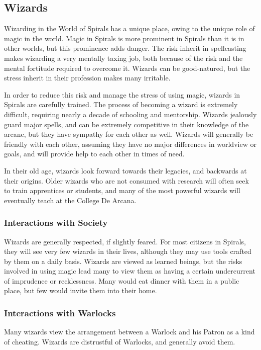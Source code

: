 \begin{multicols}{2}
\subsection{Wizards}
Wizarding in the World of Spirals has a unique place, owing to the unique role of magic in the world.
Magic in Spirals is more prominent in Spirals than it is in other worlds, but this prominence adds danger.
The risk inherit in spellcasting makes wizarding a very mentally taxing job, both because of the risk and the mental fortitude required to overcome it.
Wizards can be good-natured, but the stress inherit in their profession makes many irritable. 

In order to reduce this risk and manage the stress of using magic, wizards in Spirals are carefully trained.
The process of becoming a wizard is extremely difficult, requiring nearly a decade of schooling and mentorship.
Wizards jealously guard major spells, and can be extremely competitive in their knowledge of the arcane, but they have sympathy for each other as well.
Wizards will generally be friendly with each other, assuming they have no major differences in worldview or goals, and will provide help to each other in times of need.

In their old age, wizards look forward towards their legacies, and backwards at their origins.
Older wizards who are not consumed with research will often seek to train apprentices or students, and many of the most powerful wizards will eventually teach at the College De Arcana.

\subsubsection{Interactions with Society}
Wizards are generally respected, if slightly feared.
For most citizens in Spirals, they will see very few wizards in their lives, although they may use tools crafted by them on a daily basis.
Wizards are viewed as learned beings, but the risks involved in using magic lead many to view them as having a certain undercurrent of imprudence or recklessness.
Many would eat dinner with them in a public place, but few would invite them into their home.

\subsubsection{Interactions with Warlocks}
Many wizards view the arrangement between a Warlock and his Patron as a kind of cheating.
Wizards are distrustful of Warlocks, and generally avoid them.


\end{multicols}
